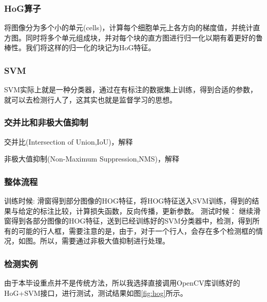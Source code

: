 \documentclass[12pt,a4paper,titlepage]{article}
\begin{document}
\subsubsection{HoG算子}
将图像分为多个小的单元(cells)，计算每个细胞单元上各方向的梯度值，并统计直方图。同时将多个单元组成块，并对每个块的直方图进行归一化以期有着更好的鲁棒性。我们将这样的归一化的块记为HoG特征。
\subsubsection{SVM}
SVM实际上就是一种分类器，通过在有标注的数据集上训练，得到合适的参数，就可以去检测行人了，这其实也就是监督学习的思想。
\subsubsection{交并比和非极大值抑制}
交并比(Intersection of Union,IoU)，解释
\par
非极大值抑制(Non-Maximum Suppression,NMS)，解释
\subsubsection{整体流程}
训练时候:
滑窗得到部分图像的HOG特征，将HOG特征送入SVM训练，得到的结果与给定的标注比较，计算损失函数，反向传播，更新参数。
测试时候：
继续滑窗得到各部分图像的HOG特征，送到已经训练好的SVM分类器中，检测，得到所有的可能的行人框，需要注意的是，由于，对于一个行人，会存在多个检测框的情况，如图。所以，需要通过非极大值抑制进行处理。
\subsubsection{检测实例}
由于本毕设重点并不是传统方法，所以我选择直接调用OpenCV库训练好的HoG+SVM接口，进行测试，测试结果如图\ref{fig:hog}所示。
\end{document}
